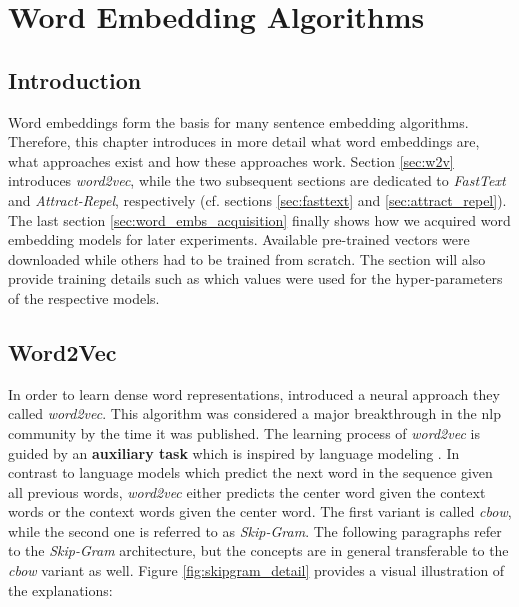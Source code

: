 %
%

\section{Word Embedding Algorithms}
\label{sec:word_embs}

\vspace*{-2mm}
\subsection{Introduction}
\label{sec:word_embs_intro}

Word embeddings form the basis for many sentence embedding algorithms. Therefore, this chapter introduces in more detail what word embeddings are, what approaches exist and how these approaches work. Section \vref{sec:w2v} introduces \textit{word2vec}, while the two subsequent sections are dedicated to \textit{FastText} and \textit{Attract-Repel}, respectively (cf. sections \vref{sec:fasttext} and \vref{sec:attract_repel}). The last section \vref{sec:word_embs_acquisition} finally shows how we acquired word embedding models for later experiments. Available pre-trained vectors were downloaded while others had to be trained from scratch. The section will also provide training details such as which values were used for the hyper-parameters of the respective models.

\subsection{Word2Vec}
\label{sec:w2v}

In order to learn dense word representations, \citep{Mikolov.2013a} introduced a neural approach they called \textit{word2vec}. This algorithm was considered a major breakthrough in the \gls{nlp} community by the time it was published. The learning process of \textit{word2vec} is guided by an \textbf{auxiliary task} which is inspired by language modeling \citep{Bengio.2003}. In contrast to language models which predict the next word in the sequence given all previous words, \textit{word2vec} either predicts the center word given the context words or the context words given the center word. The first variant is called \textit{\gls{cbow}}, while the second one is referred to as \textit{Skip-Gram}. The following paragraphs refer to the \textit{Skip-Gram} architecture, but the concepts are in general transferable to the \textit{\gls{cbow}} variant as well. Figure \vref{fig:skipgram_detail} provides a visual illustration of the explanations:

